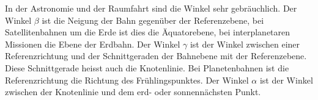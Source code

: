 In der Astronomie und der Raumfahrt sind die Winkel sehr gebräuchlich.
Der Winkel $\beta$ ist die Neigung der Bahn gegenüber der Referenzebene,
bei Satellitenbahnen um die Erde ist dies die Äquatorebene,
bei interplanetaren Missionen die Ebene der Erdbahn.
Der Winkel $\gamma$ ist der Winkel zwischen einer Referenzrichtung
und der Schnittgeraden der Bahnebene mit der Referenzebene.
Diese Schnittgerade heisst auch die Knotenlinie.
Bei Planetenbahnen ist die Referenzrichtung die Richtung des Frühlingspunktes.
Der Winkel $\alpha$ ist der Winkel zwischen der Knotenlinie und dem
erd- oder sonnennächsten Punkt.

%
%
%





